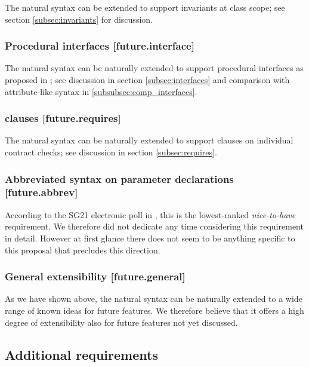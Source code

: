 The natural syntax can be extended to support invariants at class scope; see section \ref{subsec:invariants} for discussion.

\subsubsection{Procedural interfaces  [future.interface]}

The natural syntax can be naturally extended to support procedural interfaces as proposed in \cite{P0465R0}; see discussion in section \ref{subsec:interfaces} and comparison with attribute-like syntax in \ref{subsubsec:comp_interfaces}.

\subsubsection{ clauses  [future.requires]}

The natural syntax can be naturally extended to support  clauses on individual contract checks; see discussion in section \ref{subsec:requires}.

\subsubsection{Abbreviated syntax on parameter declarations  [future.abbrev]}

According to the SG21 electronic poll in \cite{P2885R3}, this is the lowest-ranked \emph{nice-to-have} requirement. We therefore did not dedicate any time considering this requirement in detail. However at first glance there does not seem to be anything specific to this proposal that precludes this direction.

\subsubsection{General extensibility  [future.general]}

As we have shown above, the natural syntax can be naturally extended to a wide range of known ideas for future features. We therefore believe that it offers a high degree of extensibility also for future features not yet discussed.

\label{subsec:future}

\subsection{Additional requirements}

